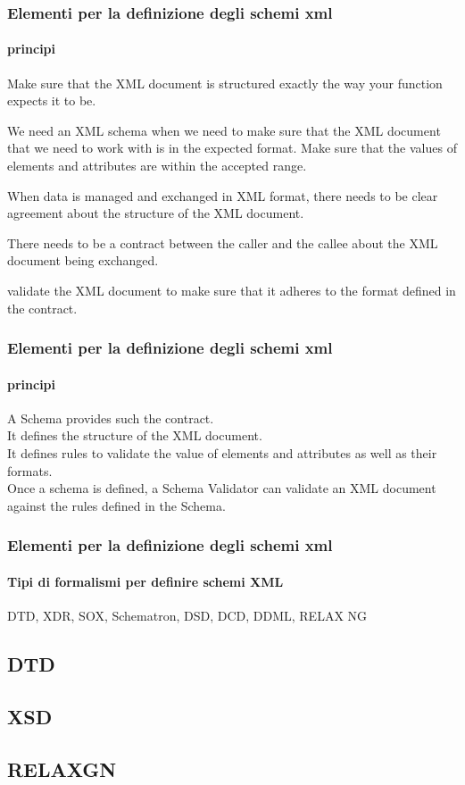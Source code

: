 \begin{frame}
    \frametitle{Elementi per la definizione degli schemi xml}
    \framesubtitle{principi}
    \addtocounter{nframe}{1}

    Make sure that the XML document is structured exactly the way your function expects it to be.

   We need an XML schema when we need to make sure that the XML document that we need to work with is in the expected format.
   Make sure that the values of elements and attributes are within the accepted range.

   When data is managed and exchanged in XML format, there needs to be clear agreement about the structure of the XML document.

   There needs to be a contract between the caller and the callee about the XML document being exchanged.

   validate the XML document to make sure that it adheres to the format defined in the contract.


\end{frame}



\begin{frame}
    \frametitle{Elementi per la definizione degli schemi xml}
    \framesubtitle{principi}
    \addtocounter{nframe}{1}

    A Schema provides such the contract. 
    \\ It defines the structure of the XML document. 
    \\ It defines rules to validate the value of elements and attributes as well as their formats. 
    \\ Once a schema is defined, a Schema Validator can validate an XML document against the rules defined in the Schema.


\end{frame}


\begin{frame}
    \frametitle{Elementi per la definizione degli schemi xml}
    \framesubtitle{Tipi di formalismi per definire schemi XML}
    \addtocounter{nframe}{1}

   DTD, XDR, SOX, Schematron, DSD, DCD, DDML, RELAX NG

\end{frame}

\subsection{DTD}


\subsection{XSD}


\subsection{RELAXGN}

